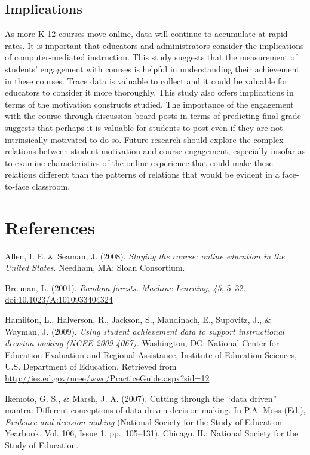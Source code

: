 \documentclass[acmart]{apa6}
\theoremstyle{definition}
\theoremstyle{definition}
\theoremstyle{definition}
\theoremstyle{remark}
\begin{document}
\subsection{Implications}\label{implications}

As more K-12 courses move online, data will continue to accumulate at
rapid rates. It is important that educators and administrators consider
the implications of computer-mediated instruction. This study suggests
that the measurement of students' engagement with courses is helpful in
understanding their achievement in these courses. Trace data is valuable
to collect and it could be valuable for educators to consider it more
thoroughly. This study also offers implications in terms of the
motivation constructs studied. The importance of the engagement with the
course through discussion board posts in terms of predicting final grade
suggests that perhaps it is valuable for students to post even if they
are not intrinsically motivated to do so. Future research should explore
the complex relations between student motivation and course engagement,
especially insofar as to examine characteristics of the online
experience that could make these relations different than the patterns
of relations that would be evident in a face-to-face classroom.

\section{References}\label{references}

\begingroup
\setlength{\parindent}{-0.5in} \setlength{\leftskip}{0.5in}

Allen, I. E. \& Seaman, J. (2008). \emph{Staying the course: online
education in the United States}. Needham, MA: Sloan Consortium.

Breiman, L. (2001). \emph{Random forests. Machine Learning, 45}, 5--32.
\url{doi:10.1023/A:1010933404324}

Hamilton, L., Halverson, R., Jackson, S., Mandinach, E., Supovitz, J.,
\& Wayman, J. (2009). \emph{Using student achievement data to support
instructional decision making (NCEE 2009-4067).} Washington, DC:
National Center for Education Evaluation and Regional Assistance,
Institute of Education Sciences, U.S. Department of Education. Retrieved
from \url{http://ies.ed.gov/ncee/wwc/PracticeGuide.aspx?sid=12}

Ikemoto, G. S., \& Marsh, J. A. (2007). Cutting through the
\enquote{data driven} mantra: Different conceptions of data-driven
decision making. In P.A. Moss (Ed.), \emph{Evidence and decision making}
(National Society for the Study of Education Yearbook, Vol. 106, Issue
1, pp.~105--131). Chicago, IL: National Society for the Study of
Education.
\end{document}
